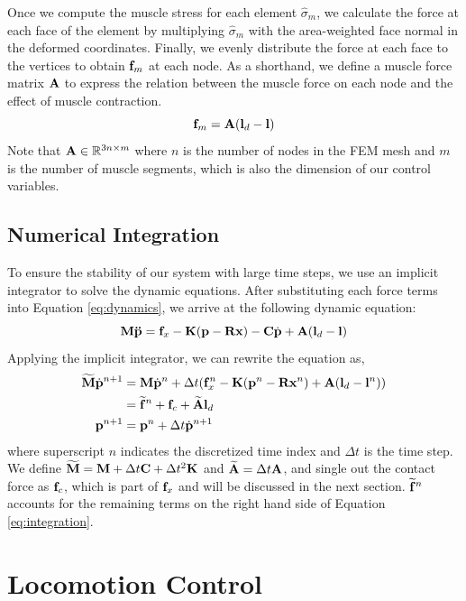 Once we compute the muscle stress for each element $\hat{\sigma}_m$,
we calculate the force at each face of the element by multiplying
$\hat{\sigma}_m$ with the area-weighted face normal in the deformed
coordinates. Finally, we evenly distribute the force at each face to
the vertices to obtain $\mathbf{f}_m$ at each node. As a shorthand, we
define a muscle force matrix $\mathbf{A}$ to express the relation between
the muscle force on each node and the effect of muscle contraction.
\begin{equation}
\mathbf{f}_m = \mathbf{A}(\mathbf{l}_d-\mathbf{l})
\end{equation}
Note that $\mathbf{A}\in \mathbb{R}^{3n\times m}$ where $n$ is the number
of nodes in the FEM mesh and $m$ is the number of muscle segments,
which is also the dimension of our control variables.

\subsection{Numerical Integration}
To ensure the stability of our system with large time steps, we use an
implicit integrator to solve the dynamic equations. After substituting
each force terms into Equation \ref{eq:dynamics}, we arrive at the following
dynamic equation:
\begin{equation}
\mathbf{M\ddot{p}}=\mathbf{f}_x-\mathbf{K}(\mathbf{p} -\mathbf{R}\mathbf{x}) -
\mathbf{C}\dot{\mathbf{p}} +\mathbf{A}(\mathbf{l}_d - \mathbf{l})
\end{equation}
Applying the implicit integrator, we can rewrite the equation as,
\begin{align}
\label{eq:integration}
\widetilde{\mathbf{M}}\dot{\mathbf{p}}^{n+1} & = \mathbf{M}\dot{\mathbf{p}}^{n} +
\Delta t(\mathbf{f}^n_{x} - \mathbf{K}(\mathbf{p}^n-\mathbf{R}\mathbf{x}^n)
+\mathbf{A}(\mathbf{l}_d-\mathbf{l}^n)) \nonumber \\
 & = \widetilde{\mathbf{f}}^n + \mathbf{f}_c + \widetilde{\mathbf{A}} \mathbf{l}_d \\
 \mathbf{p}^{n+1}& = \mathbf{p}^{n}+\Delta t \dot{\mathbf{p}}^{n+1}
\label{eq:nextState}
\end{align}
where superscript $n$ indicates the discretized time index and $\Delta
t$ is the time step. We define $\widetilde{\mathbf{M}}=\mathbf{M}+\Delta t\mathbf{C}+\Delta t^2\mathbf{K}$ and $\widetilde{\mathbf{A}}=\Delta t\mathbf{A}$, and
single out the contact force as $\mathbf{f}_c$, which is part of
$\mathbf{f}_x$ and will be discussed in the next
section. $\widetilde{\mathbf{f}}^n$ accounts for the remaining terms on
the right hand side of Equation \ref{eq:integration}.


\section{Locomotion Control}
\label{sec:control}


